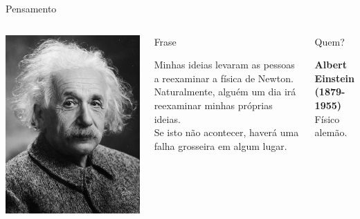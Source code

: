\documentclass[xcolor=dvipsnames,table]{beamer}
\begin{document}
	\begin{frame}{Pensamento}
		\begin{columns}
		  		\begin{center}
		    		\includegraphics[height=.6\textheight]{images/einstein.jpg}
		  		\end{center}
				\begin{block}{Frase}
					\begin{center}
						{\large Minhas ideias levaram as pessoas a reexaminar a física de Newton. Naturalmente, alguém um dia irá reexaminar minhas próprias ideias. \\Se isto não acontecer, haverá uma falha grosseira em algum lugar.}
					\end{center}
				\end{block}		  		
		  		\begin{block}{Quem?}
		  			\begin{center}
						{\bf Albert Einstein (1879-1955)} \\ Físico alemão.
					\end{center}
				\end{block}
		\end{columns}
	\end{frame}
\end{document}
